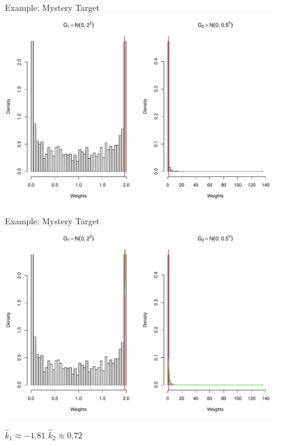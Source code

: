 \documentclass[14pt]{beamer}
\begin{document}
\begin{frame}{Example: Mystery Target}
    \centering
    \includegraphics[height=0.9\textheight, width=0.9\textwidth, keepaspectratio]{Figures/Wt Hist - Pareto Thresh.pdf}
\end{frame}

\begin{frame}{Example: Mystery Target}
    \centering
    \includegraphics[height=0.7\textheight, width=0.9\textwidth, keepaspectratio]{Figures/Wt Hist - Pareto Dens.pdf} \newline
    \begin{outline}
        $\hat{k}_1 \approx -1.81$ \hspace{2cm} $\hat{k}_2 \approx 0.72$
    \end{outline}
\end{frame}
\end{document}
